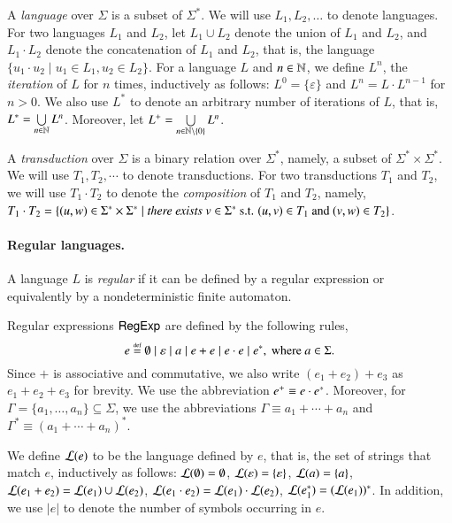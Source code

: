 A \emph{language} over $\Sigma$ is a subset of $\Sigma^*$.  
We will use $L_1, L_2, \dots$ to denote languages. For two languages $L_1$ and $L_2$, let $L_1 \cup L_2$ denote the union of $L_1$ and $L_2$, and $L_1 \cdot L_2$ denote the concatenation of $L_1$ and $L_2$, that is, the language $\{u_1 \cdot u_2 \mid u_1 \in L_1, u_2 \in L_2\}$. 
For a language $L$ and $n \in \mathbb{N}$, we define $L^n$, the \emph{iteration} of $L$ for $n$ times, inductively as follows: $L^0=\{\varepsilon\}$ and $L^{n} =L \cdot L^{n-1}$ for $n > 0$. We also use $L^*$ to denote an arbitrary number of iterations of $L$, that is, $L^* = \bigcup \limits_{n \in \mathbb{N}} L^n$. Moreover, let $L^+ = \bigcup \limits_{n \in \mathbb{N} \setminus \{0\}} L^n$. 

A \emph{transduction} over $\Sigma$ is a binary relation over $\Sigma^*$, namely, a subset of $\Sigma^* \times \Sigma^*$. We will use $T_1, T_2,\cdots$ to denote transductions. For two transductions $T_1$ and $T_2$, we will use $T_1 \cdot T_2$ to denote the \emph{composition} of $T_1$ and $T_2$, namely, $T_1 \cdot T_2 = \{(u, w) \in \Sigma^* \times \Sigma^* \mid \emph{there exists } v \in \Sigma^* \mbox{ s.t. } (u,v) \in T_1 \mbox{ and } (v,w) \in T_2\}$.

\paragraph*{Regular languages.}
A language $L$ is \emph{regular} if it can be defined by a regular expression or equivalently by a nondeterministic finite automaton.  

Regular expressions ${\sf RegExp}$ are defined by the following rules,
%
	\[e \eqdef \emptyset \mid \varepsilon \mid a \mid e + e \mid e \concat e \mid e^*, \mbox{ where } a \in \Sigma. \]
%
Since $+$ is associative and commutative, we also write $(e_1 + e_2) + e_3$ as $e_1 + e_2 + e_3$ for brevity. We use the abbreviation $e^+ \equiv e \cdot e^*$. Moreover, for $\Gamma = \{a_1, \ldots, a_n\}\subseteq \Sigma$, we use the abbreviations $\Gamma \equiv a_1 + \cdots + a_n$ and $\Gamma^\ast \equiv (a_1 + \cdots + a_n)^\ast$. 

We define $\mathcal{L}(e)$ to be the language defined by $e$, that is, the set of strings that match $e$, inductively as follows: $\mathcal{L}(\emptyset) =\emptyset$,
$\mathcal{L}(\varepsilon) =\{\varepsilon\}$,
%
$\mathcal{L}(a)= \{a\}$,
%
$\mathcal{L}(e_1 + e_2) = \mathcal{L}(e_1) \cup \mathcal{L}(e_2)$,
%
$\mathcal{L}(e_1 \cdot e_2) = \mathcal{L}(e_1) \cdot \mathcal{L}(e_2)$,
%
$\mathcal{L}(e_1^*)=(\mathcal{L}(e_1))^*$.
In addition, we use $|e|$ to denote the number of symbols occurring in $e$.

